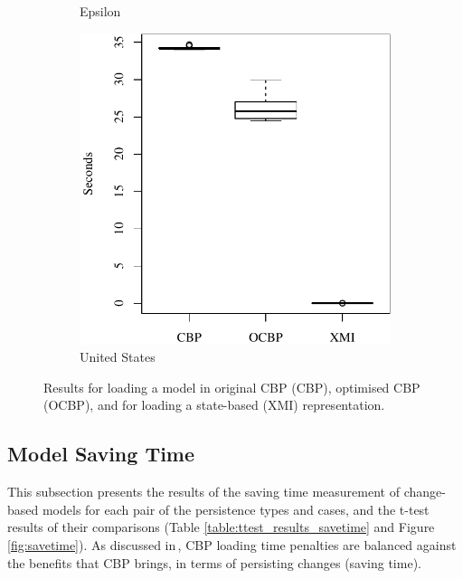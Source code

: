 \documentclass{llncs}
\begin{document}
{\begin{figure}[ht]
\begin{subfigure}{0.325\textwidth}
        \caption{Epsilon}
        \label{fig:load_time_epsilon}
    \end{subfigure}
    \hfill
    \begin{subfigure}{0.325\textwidth}
        \centering
        \includegraphics[width=\linewidth]{images/load_time_wikipedia}
        \caption{United States}
        \label{fig:load_time_wikipedia}
    \end{subfigure}
    \caption{Results for loading a model in original CBP (CBP), optimised CBP (OCBP), and for loading a state-based (XMI) representation.}
    \label{fig:loadtime}
\end{figure}

 \vspace{-25pt}
\subsection{Model Saving Time}
\label{subsec:saving_time_test}
 
  \vspace{-10pt}
 This subsection presents the results of the saving time measurement of change-based models for each pair of the persistence types and cases, and the t-test results of their comparisons (Table \ref{table:ttest_results_savetime} and Figure \ref{fig:savetime}). As discussed in\,\cite{yohannis2017turning}, CBP loading time penalties are balanced against the benefits that CBP brings, in terms of  persisting changes (saving time).
 
}
\end{document}
